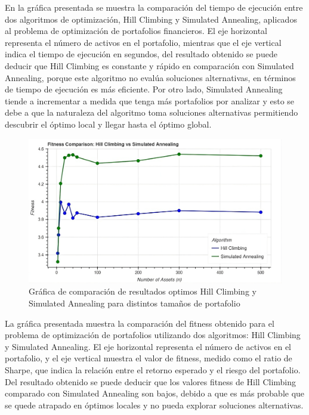 \documentclass[9pt,a4paper,twoside]{rho-class/rho}
\begin{document}
        En la gráfica presentada se muestra la comparación del tiempo de ejecución entre dos algoritmos de optimización, Hill Climbing y Simulated Annealing, aplicados al problema de optimización de portafolios financieros. El eje horizontal representa el número de activos en el portafolio, mientras que el eje vertical indica el tiempo de ejecución en segundos, del resultado obtenido se puede deducir que Hill Climbing es constante y rápido en comparación con Simulated Annealing, porque este algoritmo no evalúa soluciones alternativas, en términos de tiempo de ejecución es más eficiente. Por otro lado, Simulated Annealing tiende a incrementar a medida que tenga más portafolios por analizar y esto se debe a que la naturaleza del algoritmo toma soluciones alternativas permitiendo descubrir el óptimo local y llegar hasta el óptimo global.



        \begin{figure}[h]
            \centering
            \includegraphics[width=\linewidth]{figures/Fitness_Comparisson-9x.png}
            \caption{Gráfica de comparación de resultados optimos Hill Climbing y Simulated Annealing para distintos tamaños de portafolio}
            \label{fig:sample_figure2}
        \end{figure}

        La gráfica presentada muestra la comparación del fitness obtenido para el problema de optimización de portafolios utilizando dos algoritmos: Hill Climbing y Simulated Annealing. El eje horizontal representa el número de activos en el portafolio, y el eje vertical muestra el valor de fitness, medido como el ratio de Sharpe, que indica la relación entre el retorno esperado y el riesgo del portafolio. Del resultado obtenido se puede deducir que los valores fitness de Hill Climbing comparado con Simulated Annealing son bajos, debido a que es más probable que se quede atrapado en óptimos locales y no pueda explorar soluciones alternativas.
        
\end{document}
